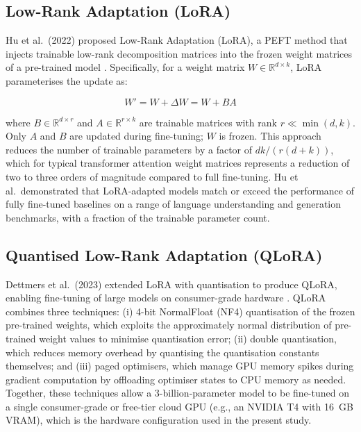\subsection{Low-Rank Adaptation (LoRA)}

Hu et al.\ (2022) proposed Low-Rank Adaptation (LoRA), a PEFT method that injects trainable low-rank decomposition matrices into the frozen weight matrices of a pre-trained model \cite{hu2022lora}. Specifically, for a weight matrix $W \in \mathbb{R}^{d \times k}$, LoRA parameterises the update as:

\begin{equation}
    W' = W + \Delta W = W + BA
\end{equation}

where $B \in \mathbb{R}^{d \times r}$ and $A \in \mathbb{R}^{r \times k}$ are trainable matrices with rank $r \ll \min(d, k)$. Only $A$ and $B$ are updated during fine-tuning; $W$ is frozen. This approach reduces the number of trainable parameters by a factor of $d k / (r(d + k))$, which for typical transformer attention weight matrices represents a reduction of two to three orders of magnitude compared to full fine-tuning. Hu et al.\ demonstrated that LoRA-adapted models match or exceed the performance of fully fine-tuned baselines on a range of language understanding and generation benchmarks, with a fraction of the trainable parameter count.

\subsection{Quantised Low-Rank Adaptation (QLoRA)}

Dettmers et al.\ (2023) extended LoRA with quantisation to produce QLoRA, enabling fine-tuning of large models on consumer-grade hardware \cite{dettmers2023qlora}. QLoRA combines three techniques: (i) 4-bit NormalFloat (NF4) quantisation of the frozen pre-trained weights, which exploits the approximately normal distribution of pre-trained weight values to minimise quantisation error; (ii) double quantisation, which reduces memory overhead by quantising the quantisation constants themselves; and (iii) paged optimisers, which manage GPU memory spikes during gradient computation by offloading optimiser states to CPU memory as needed. Together, these techniques allow a 3-billion-parameter model to be fine-tuned on a single consumer-grade or free-tier cloud GPU (e.g., an NVIDIA T4 with 16~GB VRAM), which is the hardware configuration used in the present study.

